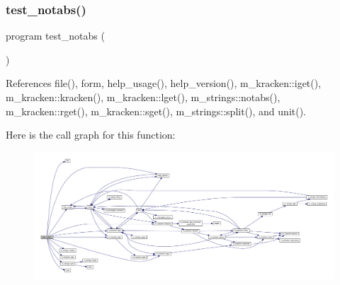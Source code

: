 \subsubsection{\texorpdfstring{test\+\_\+notabs()}{test\_notabs()}}
{\footnotesize\ttfamily program test\+\_\+notabs (\begin{DoxyParamCaption}{ }\end{DoxyParamCaption})}



References file(), form, help\+\_\+usage(), help\+\_\+version(), m\+\_\+kracken\+::iget(), m\+\_\+kracken\+::kracken(), m\+\_\+kracken\+::lget(), m\+\_\+strings\+::notabs(), m\+\_\+kracken\+::rget(), m\+\_\+kracken\+::sget(), m\+\_\+strings\+::split(), and unit().

Here is the call graph for this function\+:
\nopagebreak
\begin{figure}[H]
\begin{center}
\leavevmode
\includegraphics[width=350pt]{notabs_8f90_acb31f04c67c279d1a77f3346ad0cf516_cgraph}
\end{center}
\end{figure}
